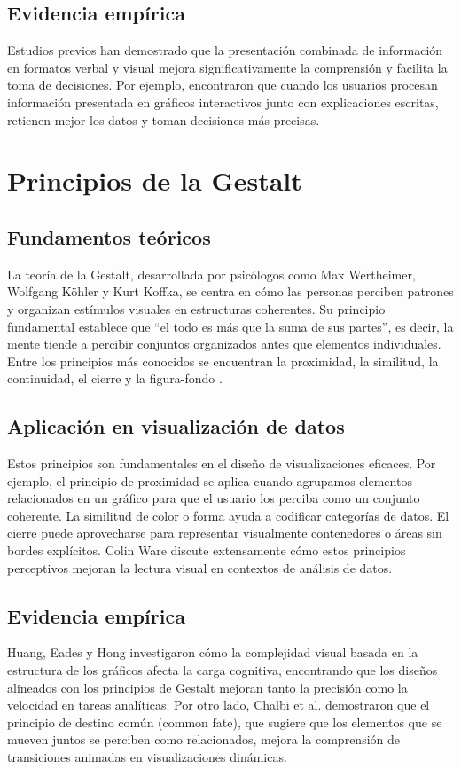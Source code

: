 \documentclass[12pt]{article}
\begin{document}
\subsection{Evidencia empírica}
Estudios previos han demostrado que la presentación combinada de información en formatos verbal y visual mejora significativamente la comprensión y facilita la toma de decisiones. Por ejemplo, \textcite{brunye2006} encontraron que cuando los usuarios procesan información presentada en gráficos interactivos junto con explicaciones escritas, retienen mejor los datos y toman decisiones más precisas.

\section{Principios de la Gestalt}

\subsection{Fundamentos teóricos}
La teoría de la Gestalt, desarrollada por psicólogos como Max Wertheimer, Wolfgang Köhler y Kurt Koffka, se centra en cómo las personas perciben patrones y organizan estímulos visuales en estructuras coherentes. Su principio fundamental establece que “el todo es más que la suma de sus partes”, es decir, la mente tiende a percibir conjuntos organizados antes que elementos individuales. Entre los principios más conocidos se encuentran la proximidad, la similitud, la continuidad, el cierre y la figura-fondo \parencite{koffka1935}.

\subsection{Aplicación en visualización de datos}
Estos principios son fundamentales en el diseño de visualizaciones eficaces. Por ejemplo, el principio de proximidad se aplica cuando agrupamos elementos relacionados en un gráfico para que el usuario los perciba como un conjunto coherente. La similitud de color o forma ayuda a codificar categorías de datos. El cierre puede aprovecharse para representar visualmente contenedores o áreas sin bordes explícitos. Colin Ware \parencite{ware2012} discute extensamente cómo estos principios perceptivos mejoran la lectura visual en contextos de análisis de datos.

\subsection{Evidencia empírica}
Huang, Eades y Hong \parencite{huang2009} investigaron cómo la complejidad visual basada en la estructura de los gráficos afecta la carga cognitiva, encontrando que los diseños alineados con los principios de Gestalt mejoran tanto la precisión como la velocidad en tareas analíticas. Por otro lado, Chalbi et al. \parencite{chalbi2019} demostraron que el principio de destino común (common fate), que sugiere que los elementos que se mueven juntos se perciben como relacionados, mejora la comprensión de transiciones animadas en visualizaciones dinámicas.
\end{document}
